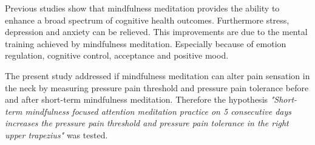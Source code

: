 Previous studies show that mindfulness meditation provides the ability to enhance a broad spectrum of cognitive health outcomes. Furthermore stress, depression and anxiety can be relieved. This improvements are due to the mental training achieved by mindfulness meditation. Especially because of emotion regulation, cognitive control, acceptance and positive mood. \cite{Zeidan2012,Zeidan2016} 


The present study addressed if mindfulness meditation can alter pain sensation in the neck by measuring pressure pain threshold and pressure pain tolerance before and after short-term mindfulness meditation. Therefore the hypothesis  \textit{"Short-term mindfulness focused attention meditation practice on 5 consecutive days increases the pressure pain threshold and pressure pain tolerance in the right upper trapezius"} was tested.

